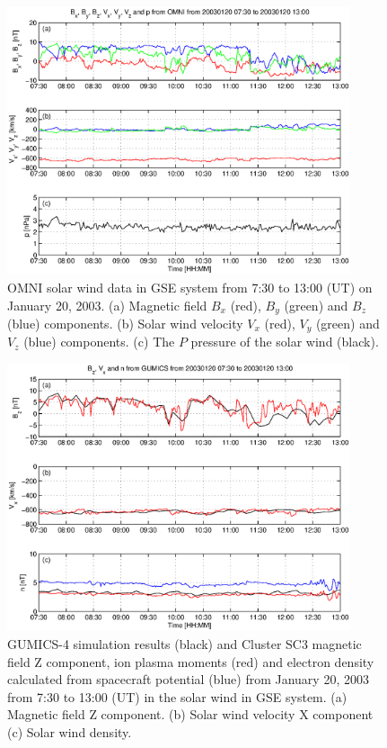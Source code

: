 \documentclass[linenumbers,draft]{agujournal}
\begin{document}
\begin{figure}[h]
\centering
\includegraphics[width=0.9\textwidth,angle=0]{swe-2020-corr-f02}  
\caption{OMNI solar wind data in GSE system from 7:30 to 13:00 (UT) on January 20, 2003. (a) Magnetic field $B_{x}$ (red), $B_{y}$ (green) and $B_{z}$ (blue) components. (b) Solar wind velocity $V_{x}$ (red), $V_{y}$ (green) and $V_{z}$ (blue) components. (c) The $P$ pressure of the solar wind (black).}

\label{fig:swomni}
\end{figure}

\pagebreak

\begin{figure}[h]
\centering
\includegraphics[width=0.9\textwidth,angle=0]{swe-2020-corr-f03}  
\caption{GUMICS-4 simulation results (black) and Cluster SC3 magnetic field Z component, ion plasma moments (red) and electron density calculated from spacecraft potential (blue) from January 20, 2003 from 7:30 to 13:00 (UT) in the solar wind in GSE system. (a) Magnetic field Z component. (b) Solar wind velocity X component (c) Solar wind density.}
\label{fig:swplot}
\end{figure}
\end{document}
